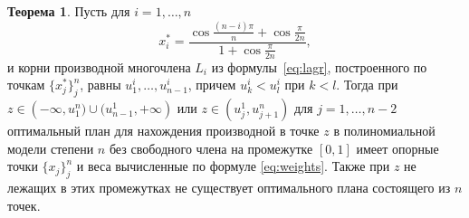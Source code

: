 \documentclass[specialist,
               substylefile = spbu.rtx,
               subf,href,colorlinks=true, 12pt]{disser}
\theoremstyle{definition}
\newtheorem{theorem}{Теорема}
\begin{document}
	\begin{theorem}
	\label{th1}
		Пусть для $i = 1, \ldots, n$ 
		\begin{equation}
			\label{eq:th1:points}
			x_i^* = \frac{\cos \frac{(n - i) \pi}{n} + \cos \frac{\pi}{2n}}{1 + \cos \frac{\pi}{2n}} ,
		\end{equation}
		и корни производной многочлена $L_i$ из формулы~\eqref{eq:lagr}, построенного по точкам $\{x_j^*\}_j^n$, равны $u_1^i, \ldots, u_{n-1}^i$, причем $u_k^i < u_l^i$ при $k < l$. Тогда при $z \in \left(-\infty, u_1^n) \cup (u_{n-1}^1, +\infty \right)$ или $z \in \left( u^1_j, u^n_{j+1} \right)$ для $j=1, \ldots, n-2$ оптимальный план для нахождения производной в точке $z$ в полиномиальной модели степени $n$ без свободного члена на промежутке $[0, 1]$ имеет опорные точки $\{x_j\}_j^n$ и веса вычисленные по формуле \eqref{eq:weights}. Также при $z$ не лежащих в этих промежутках не существует оптимального плана состоящего из $n$ точек.
	\end{theorem}
\end{document}
